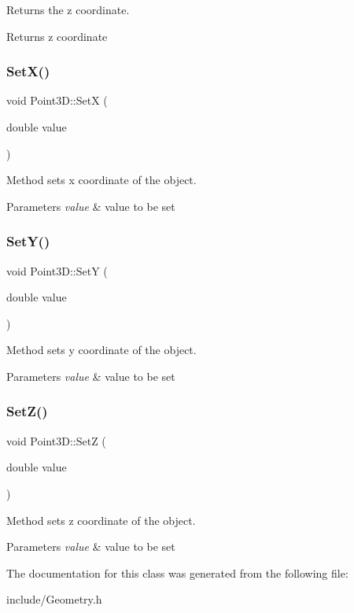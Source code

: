Returns the z coordinate. \begin{DoxyReturn}{Returns}
z coordinate 
\end{DoxyReturn}
\hypertarget{class_point3_d_a49f776d3cf82882d8ea1971cea9ffda3}{}\label{class_point3_d_a49f776d3cf82882d8ea1971cea9ffda3} 
\subsubsection{\texorpdfstring{Set\+X()}{SetX()}}
{\footnotesize\ttfamily void Point3\+D\+::\+SetX (\begin{DoxyParamCaption}\item[{double}]{value }\end{DoxyParamCaption})}

Method sets x coordinate of the object. 
\begin{DoxyParams}{Parameters}
{\em value} & value to be set \\
\hline
\end{DoxyParams}
\hypertarget{class_point3_d_a7d770b248d505057a7ef5c59092ab1e3}{}\label{class_point3_d_a7d770b248d505057a7ef5c59092ab1e3} 
\subsubsection{\texorpdfstring{Set\+Y()}{SetY()}}
{\footnotesize\ttfamily void Point3\+D\+::\+SetY (\begin{DoxyParamCaption}\item[{double}]{value }\end{DoxyParamCaption})}

Method sets y coordinate of the object. 
\begin{DoxyParams}{Parameters}
{\em value} & value to be set \\
\hline
\end{DoxyParams}
\hypertarget{class_point3_d_a2f7667f3e19b8ac1335f50794232a2c5}{}\label{class_point3_d_a2f7667f3e19b8ac1335f50794232a2c5} 
\subsubsection{\texorpdfstring{Set\+Z()}{SetZ()}}
{\footnotesize\ttfamily void Point3\+D\+::\+SetZ (\begin{DoxyParamCaption}\item[{double}]{value }\end{DoxyParamCaption})}

Method sets z coordinate of the object. 
\begin{DoxyParams}{Parameters}
{\em value} & value to be set \\
\hline
\end{DoxyParams}


The documentation for this class was generated from the following file\+:\begin{DoxyCompactItemize}
\item 
include/Geometry.\+h\end{DoxyCompactItemize}

